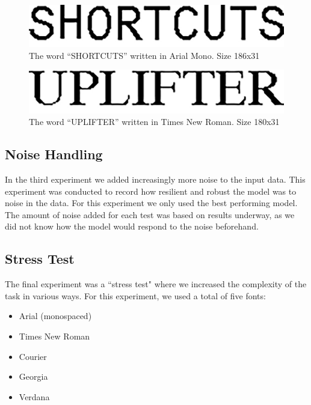 \begin{figure}[ht]
    \centering
    \includegraphics[width=.8\textwidth]{fig/experiments/SHORTCUTS_dpi.png}
    \captionsetup{justification=centering}
    \caption{The word ``SHORTCUTS'' written in Arial Mono. Size 186x31}
\end{figure}

\begin{figure}[ht]
    \centering
    \includegraphics[width=.8\textwidth]{fig/experiments/UPLIFTER_dpi.png}
    \captionsetup{justification=centering}
    \caption{The word ``UPLIFTER'' written in Times New Roman. Size 180x31}
\end{figure}

\subsection{Noise Handling}
In the third experiment we added increasingly more noise to the input data. This experiment was conducted to record how resilient and robust the model was to noise in the data. For this experiment we only used the best performing model. The amount of noise added for each test was based on results underway, as we did not know how the model would respond to the noise beforehand.

\subsection{Stress Test}
The final experiment was a ``stress test" where we increased the complexity of the task in various ways. For this experiment, we used a total of five fonts:

\begin{itemize}
    \item Arial (monospaced)
    \item Times New Roman
    \item Courier
    \item Georgia
    \item Verdana
\end{itemize}

